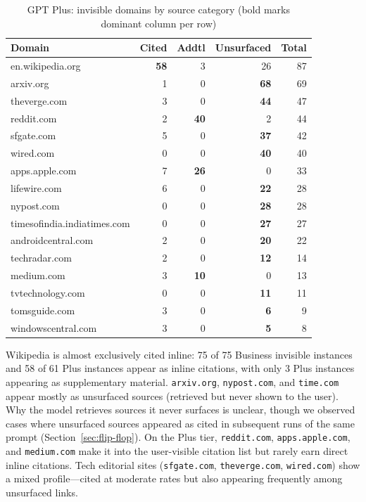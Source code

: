 \begin{table}[H]
\centering
\caption{GPT Plus: invisible domains by source category
(bold marks dominant column per row)}
\label{tab:pers-invisible-combined}
\small
\begin{tabular}{lrrrr}
\toprule
Domain & Cited & Addtl & Unsurfaced & Total \\
\midrule
en.wikipedia.org & \textbf{58} & 3 & 26 & 87 \\
arxiv.org & 1 & 0 & \textbf{68} & 69 \\
theverge.com & 3 & 0 & \textbf{44} & 47 \\
reddit.com & 2 & \textbf{40} & 2 & 44 \\
sfgate.com & 5 & 0 & \textbf{37} & 42 \\
wired.com & 0 & 0 & \textbf{40} & 40 \\
apps.apple.com & 7 & \textbf{26} & 0 & 33 \\
lifewire.com & 6 & 0 & \textbf{22} & 28 \\
nypost.com & 0 & 0 & \textbf{28} & 28 \\
timesofindia.indiatimes.com & 0 & 0 & \textbf{27} & 27 \\
androidcentral.com & 2 & 0 & \textbf{20} & 22 \\
techradar.com & 2 & 0 & \textbf{12} & 14 \\
medium.com & 3 & \textbf{10} & 0 & 13 \\
tvtechnology.com & 0 & 0 & \textbf{11} & 11 \\
tomsguide.com & 3 & 0 & \textbf{6} & 9 \\
windowscentral.com & 3 & 0 & \textbf{5} & 8 \\
\bottomrule
\end{tabular}
\end{table}

\noindent Wikipedia is almost exclusively cited inline: 75 of 75 Business invisible instances and 58 of 61 Plus instances appear as inline citations, with only 3 Plus instances appearing as supplementary material. \texttt{arxiv.org}, \texttt{nypost.com}, and \texttt{time.com} appear mostly as unsurfaced sources (retrieved but never shown to the user). Why the model retrieves sources it never surfaces is unclear, though we observed cases where unsurfaced sources appeared as cited in subsequent runs of the same prompt (Section~\ref{sec:flip-flop}). On the Plus tier, \texttt{reddit.com}, \texttt{apps.apple.com}, and \texttt{medium.com} make it into the user-visible citation list but rarely earn direct inline citations. Tech editorial sites (\texttt{sfgate.com}, \texttt{theverge.com}, \texttt{wired.com}) show a mixed profile---cited at moderate rates but also appearing frequently among unsurfaced links.

